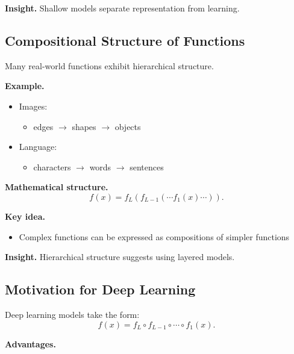 \medskip

\noindent
\textbf{Insight.}  
Shallow models separate representation from learning.

\subsection{Compositional Structure of Functions}

Many real-world functions exhibit hierarchical structure.

\medskip

\noindent
\textbf{Example.}

\begin{itemize}
    \item Images:
    \begin{itemize}
        \item edges $\rightarrow$ shapes $\rightarrow$ objects
    \end{itemize}

    \item Language:
    \begin{itemize}
        \item characters $\rightarrow$ words $\rightarrow$ sentences
    \end{itemize}
\end{itemize}

\medskip

\noindent
\textbf{Mathematical structure.}
\[
f(x) = f_L(f_{L-1}(\cdots f_1(x)\cdots)).
\]

\medskip

\noindent
\textbf{Key idea.}
\begin{itemize}
    \item Complex functions can be expressed as compositions of simpler functions
\end{itemize}

\medskip

\noindent
\textbf{Insight.}  
Hierarchical structure suggests using layered models.

\subsection{Motivation for Deep Learning}

Deep learning models take the form:
\[
f(x) = f_L \circ f_{L-1} \circ \cdots \circ f_1(x).
\]

\medskip

\noindent
\textbf{Advantages.}

